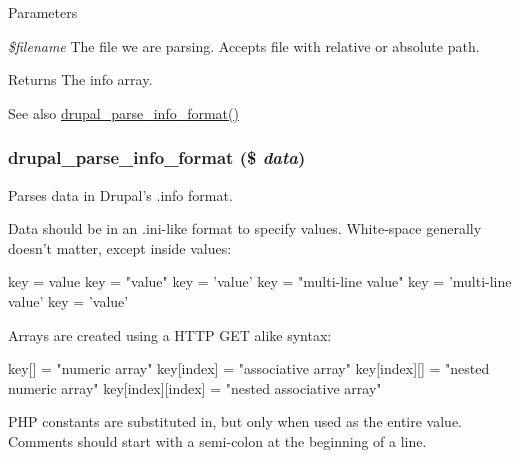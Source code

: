 \begin{DoxyParams}{Parameters}
\item[{\em \$filename}]The file we are parsing. Accepts file with relative or absolute path.\end{DoxyParams}
\begin{DoxyReturn}{Returns}
The info array.
\end{DoxyReturn}
\begin{DoxySeeAlso}{See also}
\hyperlink{common_8inc_a21afcac6900bc25323023a53b9c3d100}{drupal\_\-parse\_\-info\_\-format()} 
\end{DoxySeeAlso}
\hypertarget{common_8inc_a21afcac6900bc25323023a53b9c3d100}{
\subsubsection[{drupal\_\-parse\_\-info\_\-format}]{\setlength{\rightskip}{0pt plus 5cm}drupal\_\-parse\_\-info\_\-format (\$ {\em data})}}
\label{common_8inc_a21afcac6900bc25323023a53b9c3d100}
Parses data in Drupal's .info format.

Data should be in an .ini-\/like format to specify values. White-\/space generally doesn't matter, except inside values: 
\begin{DoxyCode}
   key = value
   key = "value"
   key = 'value'
   key = "multi-line
   value"
   key = 'multi-line
   value'
   key
   =
   'value'
\end{DoxyCode}


Arrays are created using a HTTP GET alike syntax: 
\begin{DoxyCode}
   key[] = "numeric array"
   key[index] = "associative array"
   key[index][] = "nested numeric array"
   key[index][index] = "nested associative array"
\end{DoxyCode}


PHP constants are substituted in, but only when used as the entire value. Comments should start with a semi-\/colon at the beginning of a line.


